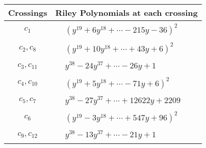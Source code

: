\documentclass[1p]{elsarticle_modified}
\theoremstyle{definition}
\begin{document}
\begin{tabular}{m{50pt}|m{274pt}}
Crossings & \hspace{64pt}Riley Polynomials at each crossing \\
\hline $$\begin{aligned}c_{1}\end{aligned}$$&$\begin{aligned}
&(y^{19}+6 y^{18}+\cdots-215 y-36)^{2}
\end{aligned}$\\
\hline $$\begin{aligned}c_{2},c_{8}\end{aligned}$$&$\begin{aligned}
&(y^{19}+10 y^{18}+\cdots+43 y+6)^{2}
\end{aligned}$\\
\hline $$\begin{aligned}c_{3},c_{11}\end{aligned}$$&$\begin{aligned}
&y^{38}-24 y^{37}+\cdots-26 y+1
\end{aligned}$\\
\hline $$\begin{aligned}c_{4},c_{10}\end{aligned}$$&$\begin{aligned}
&(y^{19}+5 y^{18}+\cdots-71 y+6)^{2}
\end{aligned}$\\
\hline $$\begin{aligned}c_{5},c_{7}\end{aligned}$$&$\begin{aligned}
&y^{38}-27 y^{37}+\cdots+12622 y+2209
\end{aligned}$\\
\hline $$\begin{aligned}c_{6}\end{aligned}$$&$\begin{aligned}
&(y^{19}-3 y^{18}+\cdots+547 y+96)^{2}
\end{aligned}$\\
\hline $$\begin{aligned}c_{9},c_{12}\end{aligned}$$&$\begin{aligned}
&y^{38}-13 y^{37}+\cdots-21 y+1
\end{aligned}$\\
\hline
\end{tabular}\\~\\
\end{document}
